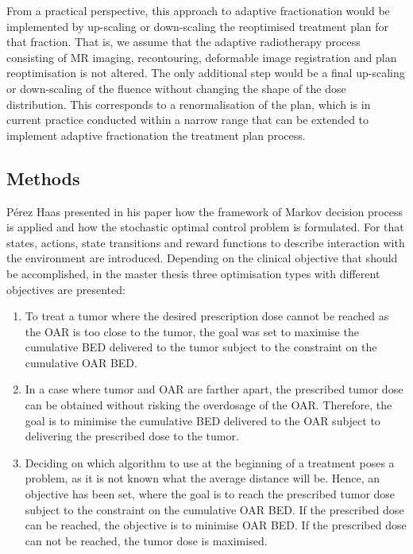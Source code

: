 \documentclass[\relativeRoot/ada.tex]{subfiles}
\begin{document}
From a practical perspective, this approach to adaptive fractionation would be implemented by up-scaling or down-scaling the reoptimised treatment plan for that fraction. That is, we assume that the adaptive radiotherapy process consisting of MR imaging, recontouring, deformable image registration and plan reoptimisation is not altered. The only additional step would be a final up-scaling or down-scaling of the fluence without changing the shape of the dose distribution. This corresponds to a renormalisation of the plan, which is in current practice conducted within a narrow range that can be extended to implement adaptive fractionation the treatment plan process.

\subsection{Methods}

Pérez Haas \cite{perezhaas_adaptive} presented in his paper how the framework of Markov decision process is applied and how the stochastic optimal control problem is formulated. For that states, actions, state transitions and reward functions to describe interaction with the environment are introduced. Depending on the clinical objective that should be accomplished, in the master thesis \cite{perezhaas_master} three optimisation types with different objectives are presented:
\begin{enumerate}
    \item To treat a tumor where the desired prescription dose cannot be reached as the OAR is too close to the tumor, the goal was set to maximise the cumulative BED delivered to the tumor subject to the constraint on the cumulative OAR BED.
    \item In a case where tumor and OAR are farther apart, the prescribed tumor dose can be obtained without risking the overdosage of the OAR. Therefore, the goal is to minimise the cumulative BED delivered to the OAR subject to delivering the prescribed dose to the tumor.
    \item Deciding on which algorithm to use at the beginning of a treatment poses a problem, as it is not known what the average distance will be. Hence, an objective has been set, where the goal is to reach the prescribed tumor dose subject to the constraint on the cumulative OAR BED. If the prescribed dose can be reached, the objective is to minimise OAR BED. If the prescribed dose can not be reached, the tumor dose is maximised.
\end{enumerate}
\end{document}
